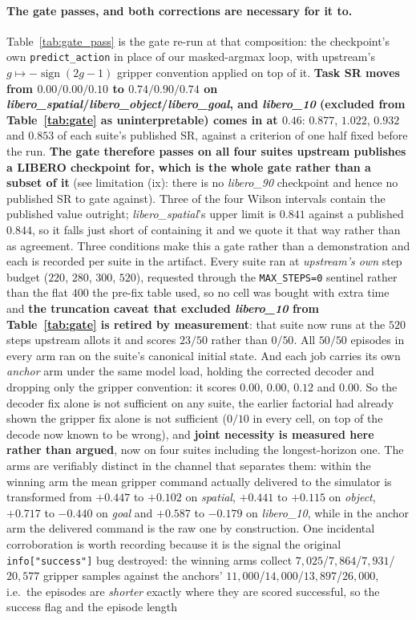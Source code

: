\documentclass{article}
\begin{document}
\paragraph{The gate passes, and both corrections are necessary for it to.} Table~\ref{tab:gate_pass} is the gate re-run at that composition: the checkpoint's own \texttt{predict\_action} in place of our masked-argmax loop, with upstream's $g \mapsto -\operatorname{sign}(2g{-}1)$ gripper convention applied on top of it. \textbf{Task SR moves from $0.00/0.00/0.10$ to $0.74/0.90/0.74$ on \emph{libero\_spatial}/\emph{libero\_object}/\emph{libero\_goal}, and \emph{libero\_10} (excluded from Table~\ref{tab:gate} as uninterpretable) comes in at $0.46$}: $0.877$, $1.022$, $0.932$ and $0.853$ of each suite's published SR, against a criterion of one half fixed before the run. \textbf{The gate therefore passes on all four suites upstream publishes a LIBERO checkpoint for, which is the whole gate rather than a subset of it} (see limitation (ix): there is no \emph{libero\_90} checkpoint and hence no published SR to gate against). Three of the four Wilson intervals contain the published value outright; \emph{libero\_spatial}'s upper limit is $0.841$ against a published $0.844$, so it falls just short of containing it and we quote it that way rather than as agreement. Three conditions make this a gate rather than a demonstration and each is recorded per suite in the artifact. Every suite ran at \emph{upstream's own} step budget ($220$, $280$, $300$, $520$), requested through the \texttt{MAX\_STEPS=0} sentinel rather than the flat $400$ the pre-fix table used, so no cell was bought with extra time and \textbf{the truncation caveat that excluded \emph{libero\_10} from Table~\ref{tab:gate} is retired by measurement}: that suite now runs at the $520$ steps upstream allots it and scores $23/50$ rather than $0/50$. All $50/50$ episodes in every arm ran on the suite's canonical initial state. And each job carries its own \emph{anchor} arm under the same model load, holding the corrected decoder and dropping only the gripper convention: it scores $0.00$, $0.00$, $0.12$ and $0.00$. So the decoder fix alone is not sufficient on any suite, the earlier factorial had already shown the gripper fix alone is not sufficient ($0/10$ in every cell, on top of the decode now known to be wrong), and \textbf{joint necessity is measured here rather than argued}, now on four suites including the longest-horizon one. The arms are verifiably distinct in the channel that separates them: within the winning arm the mean gripper command actually delivered to the simulator is transformed from $+0.447$ to $+0.102$ on \emph{spatial}, $+0.441$ to $+0.115$ on \emph{object}, $+0.717$ to $-0.440$ on \emph{goal} and $+0.587$ to $-0.179$ on \emph{libero\_10}, while in the anchor arm the delivered command is the raw one by construction. One incidental corroboration is worth recording because it is the signal the original \texttt{info["success"]} bug destroyed: the winning arms collect $7{,}025$/$7{,}864$/$7{,}931$/$20{,}577$ gripper samples against the anchors' $11{,}000$/$14{,}000$/$13{,}897$/$26{,}000$, i.e.\ the episodes are \emph{shorter} exactly where they are scored successful, so the success flag and the episode length 
\end{document}
